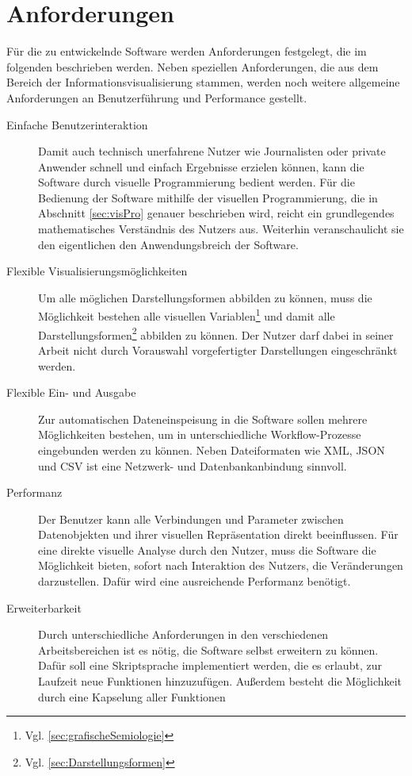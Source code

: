 \documentclass[a4paper, 12pt, DIVcalc, onepage, pdftex, headsepline, footsepline]{scrreprt}
\begin{document}
\section{Anforderungen}
\label{sec:Anforderungen}
Für die zu entwickelnde Software werden Anforderungen festgelegt, die
im folgenden beschrieben werden. Neben speziellen Anforderungen, die aus
dem Bereich der Informationsvisualisierung stammen, werden noch weitere
allgemeine Anforderungen an Benutzerführung und Performance gestellt.
\begin{description}
\item[Einfache Benutzerinteraktion]
Damit auch technisch unerfahrene Nutzer wie Journalisten oder private
Anwender schnell und einfach Ergebnisse erzielen können, kann die Software
durch visuelle Programmierung bedient werden. Für die Bedienung der Software mithilfe der visuellen
Programmierung, die in Abschnitt \ref{sec:visPro} genauer beschrieben wird,
reicht ein grundlegendes mathematisches Verständnis des Nutzers aus.
Weiterhin veranschaulicht sie den eigentlichen den Anwendungsbreich der Software.
\item[Flexible Visualisierungsmöglichkeiten]
Um alle möglichen Darstellungsformen abbilden zu können, muss die 
Möglichkeit bestehen alle visuellen Variablen\footnote{Vgl.
\ref{sec:grafischeSemiologie}} und damit alle Darstellungsformen\footnote{Vgl.
\ref{sec:Darstellungsformen}} abbilden zu können. Der Nutzer darf dabei
in seiner Arbeit nicht durch Vorauswahl vorgefertigter Darstellungen
eingeschränkt werden.
\item[Flexible Ein- und Ausgabe]
Zur automatischen Dateneinspeisung in die Software sollen mehrere Möglichkeiten
bestehen, um in unterschiedliche Workflow-Prozesse eingebunden werden zu können.
Neben Dateiformaten wie XML, JSON und CSV ist eine Netzwerk- und
Datenbankanbindung sinnvoll.
\item[Performanz]
Der Benutzer kann alle Verbindungen und Parameter zwischen Datenobjekten und ihrer
visuellen Repräsentation direkt beeinflussen. Für eine direkte visuelle Analyse
durch den Nutzer, muss die Software die Möglichkeit bieten, sofort
nach Interaktion des Nutzers, die Veränderungen darzustellen. Dafür wird eine
ausreichende Performanz benötigt.
\item[Erweiterbarkeit]
Durch unterschiedliche Anforderungen in den verschiedenen Arbeitsbereichen ist
es nötig, die Software selbst erweitern zu können. Dafür soll eine Skriptsprache
implementiert werden, die es erlaubt, zur Laufzeit neue Funktionen hinzuzufügen.
Außerdem besteht die Möglichkeit durch eine Kapselung aller Funktionen

\end{description}
\end{document}
